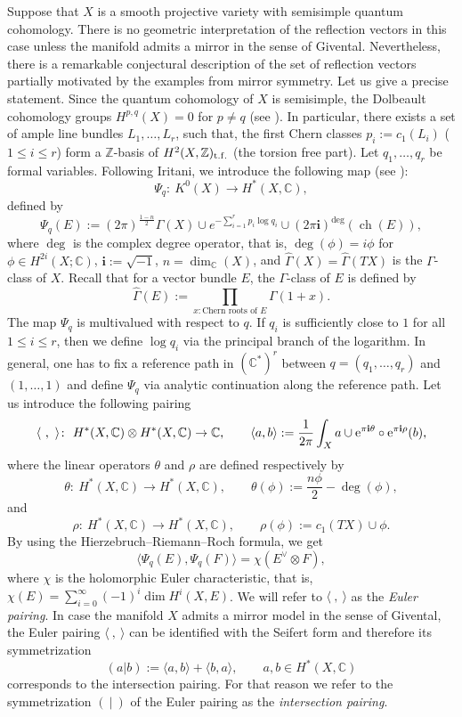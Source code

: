 \documentclass[pdftex]{sigma}
\numberwithin{equation}{section}
\newcommand{\CC}{\mathbb{C}}
\newcommand{\ZZ}{\mathbb{Z}}
\newcommand{\ii}{\mathbf{i}}
\begin{document}
Suppose that $X$ is a
smooth projective variety with semisimple quantum cohomology. There
is no geometric interpretation of the reflection vectors in
this case unless the manifold admits a mirror in the sense of
Givental. Nevertheless, there is a remarkable conjectural description
of the set of reflection vectors partially motivated by the examples
from mirror symmetry. Let us give a precise statement. Since the
quantum cohomology of $X$ is semisimple, the Dolbeault cohomology
groups $H^{p,q}(X)=0$ for $p\neq q$ (see \cite{HerMaTe}). In particular, there exists a set
of ample line bundles $L_1,\dots, L_r$, such that, the first Chern
classes $p_i:=c_1(L_i)$ ($1\leq i\leq r$) form a $\ZZ$-basis of
$H^2(X,\ZZ)_{\rm t.f.}$ (the torsion free part). Let $q_1,\dots, q_r$ be formal
variables. Following Iritani, we introduce the following map (see
\cite{Iritani:gamma_structure}):
\begin{equation}\label{psi}
\Psi_q\colon\ K^0(X) \to H^*(X,\CC),
\end{equation}
defined by
\[
\Psi_q(E) := (2\pi)^{\tfrac{1-n}{2}} \widehat{\Gamma}(X)\cup
e^{-\sum_{i=1}^r p_i\log q_i} \cup (2\pi\ii)^{\operatorname{deg}}
(\operatorname{ch}(E)),
\]
where $\operatorname{deg}$ is the complex degree operator, that is,
$\operatorname{deg}(\phi) = i \phi$ for $\phi\in H^{2i}(X;\CC)$,
$\ii:=\sqrt{-1}$, $n=\operatorname{dim}_\CC(X)$, and
$\widehat{\Gamma}(X) = \widehat{\Gamma}(TX)$ is the $\Gamma$-class of
$X$. Recall that for a vector bundle $E$, the $\Gamma$-class of $E$ is defined by
\[
\widehat{\Gamma}(E) := \prod_{x\colon \text{Chern roots of } E } \Gamma(1+x).
\]
The map $\Psi_q$ is multivalued with respect to $q$. If $q_i$ is
sufficiently close to $1$ for all $1\leq i\leq r$, then we define
$\log q_i$ via the principal branch of the logarithm. In general, one
has to fix a reference path in $(\CC^*)^r$ between $q=(q_1,\dots, q_r)$ and
$(1,\dots,1)$ and define $\Psi_q$ via analytic continuation along the
reference path.
Let us introduce the following pairing
\[%
\langle\ ,\ \rangle\colon\ H^*(X,\CC)\otimes H^*(X,\CC)\to \CC,\qquad
\langle a, b \rangle := \frac{1}{2\pi} \int_X a\cup {\rm e}^{\pi \ii
 \theta}\circ {\rm e}^{\pi\ii\rho} (b),
\]
where the linear operators $\theta$ and $\rho$ are defined
respectively by
\[
\theta\colon\ H^*(X,\CC)\to H^*(X,\CC),\qquad
\theta(\phi):=\frac{n \phi }{2}-\operatorname{deg}(\phi),
\]
and
\[
\rho\colon\ H^*(X,\CC)\to H^*(X,\CC),\qquad \rho(\phi) := c_1(TX)\cup \phi.
\]
By using the Hierzebruch--Riemann--Roch formula, we get
\[
\langle \Psi_q(E),\Psi_q(F) \rangle = \chi(E^\vee \otimes F),
\]
where $\chi$ is the holomorphic Euler characteristic, that is,
$\chi(E)=\sum_{i=0}^\infty (-1)^i \operatorname{dim} H^i(X,E)$. We
will refer to $\langle\ ,\ \rangle$ as the {\em Euler pairing}. In
case the manifold $X$ admits a mirror model in the sense of Givental,
the Euler pairing $\langle\ ,\ \rangle$ can be identified with the
Seifert form and therefore its symmetrization
\[
(a|b):= \langle a, b\rangle + \langle b,a\rangle,\qquad a,b\in H^*(X,\CC)
\]
corresponds to the intersection pairing. For that reason we refer to
the symmetrization $(\ |\ )$ of the Euler pairing as the {\em
 intersection pairing}.
\end{document}
